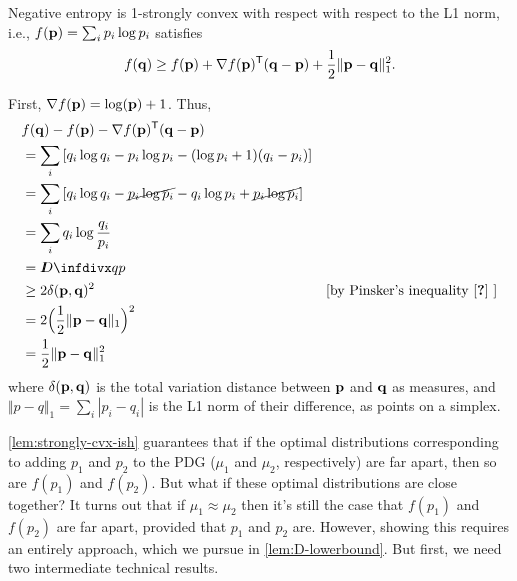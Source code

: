 \begin{lemma} \label{lem:negent-strongly-cvx-1norm}
    Negative entropy is 1-strongly convex with 
    respect with respect to the L1 norm, i.e.,
    $f(\mathbf p) = \sum_i p_i \log p_i$ satisfies
    \[
        f(\mathbf q) \ge f(\mathbf p) + \nabla f(\mathbf p)^{\sf T} (\mathbf q - \mathbf p)
            + \frac12 \Vert \mathbf p - \mathbf q \Vert_1^2.
    \]
\end{lemma}
\begin{lproof}
    First, $\nabla f(\mathbf p) = \log(\mathbf p) + 1$. 
    Thus, 
    \begin{align*}
        &f(\mat q) - f(\mat p) - \nabla f(\mat p)^{\sf T} (\mat q - \mat p)\\
        &= \sum_i \left[ q_i \log q_i - p_i \log p_i - (\log p_i + 1)(q_i-p_i) \right]\\
        &= \sum_i \left[ q_i \log q_i - \Cancel{p_i \log p_i} - q_i \log p_i + \Cancel{p_i \log p_i} \right]\\
        &= \sum_i q_i \log \frac{q_i}{p_i} \\
        &= \kldiv{q}{p} \\
        &\ge 2 \delta(\mat p, \mat q)^2
            &[\text{by Pinsker's inequality
                \parencite{pinsker-inequality}
            }] \\
        &= 2 \Big(\frac12 \Vert \mat p - \mat q \Vert_1 \Big)^2 \\
        &= \frac12 \Vert \mat p - \mat q \Vert_1^2
    \end{align*}
    where $\delta(\mathbf p, \mathbf q)$ is the total variation distance between $\mathbf p$ and $\mathbf q$ as measures, and $\Vert p - q \Vert_1 = \sum_i |p_i - q_i|$ is the L1 norm of their difference, as
    points on a simplex. 
\end{lproof}

\cref{lem:strongly-cvx-ish} guarantees
that if the optimal distributions corresponding to adding $p_1$ and $p_2$ to the PDG
($\mu_1$ and $\mu_2$, respectively) are far apart, then so are
$f(p_1)$ and $f(p_2)$.  But what if these optimal distributions are close together?
It turns out that if $\mu_1 \approx \mu_2$ then it's still the case that $f(p_1)$ and $f(p_2)$ are far apart, provided that $p_1$ and $p_2$ are.
However, showing this requires an entirely approach, which we pursue in \cref{lem:D-lowerbound}.
But first, we need two intermediate technical results.

